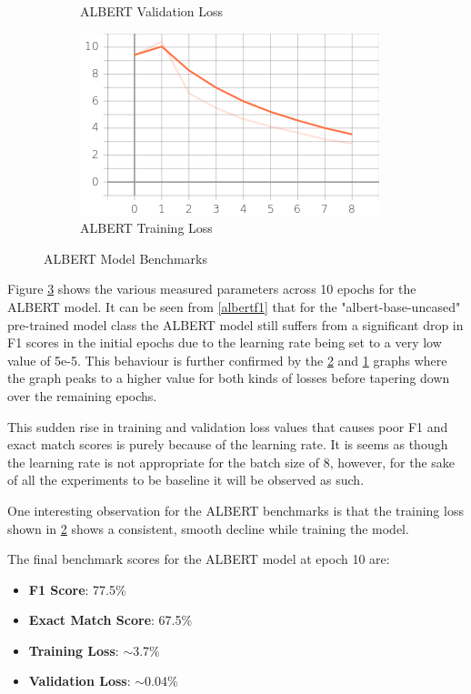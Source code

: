 \documentclass[a4paper,12pt]{report}
\begin{document}
\begin{figure}
\begin{subfigure}[b]{0.4\textwidth}
    			\caption{\small ALBERT Validation Loss}
    			\label{albertValLoss}
    		\end{subfigure}
    		\hfill
    		\begin{subfigure}[b]{0.4\textwidth}
    			\centering
    			\includegraphics[width=\textwidth]{../images/Albert_Train_Loss.png}
    			\caption{\small ALBERT Training Loss}
    			\label{albertTrainLoss}
    		\end{subfigure}
    		\caption{ALBERT Model Benchmarks}
    		\label{albertBenchmarks}
    	\end{figure}

    	Figure \ref{albertBenchmarks} shows the various measured parameters across 10 epochs for the ALBERT model. It can be seen from \ref{albertf1} that for the "albert-base-uncased" pre-trained model class the ALBERT model still suffers from a significant drop in F1 scores in the initial epochs due to the learning rate being set to a very low value of 5e-5. This behaviour is further confirmed by the \ref{albertTrainLoss} and \ref{albertValLoss} graphs where the graph peaks to a higher value for both kinds of losses before tapering down over the remaining epochs.

    	This sudden rise in training and validation loss values that causes poor F1 and exact match scores is purely because of the learning rate. It is seems as though the learning rate is  not appropriate for the batch size of 8, however, for the sake of all the experiments to be baseline it will be observed as such.

    	One interesting observation for the ALBERT benchmarks is that the training loss shown in \ref{albertTrainLoss} shows a consistent, smooth decline while training the model.


    	The final benchmark scores for the ALBERT model at epoch 10 are:
    	\begin{itemize}
    		\item \textbf{F1 Score}: 77.5\%
    		\item \textbf{Exact Match Score}: 67.5\%
    		\item \textbf{Training Loss}:  $\sim$3.7\%
    		\item \textbf{Validation Loss}: $\sim$0.04\%
    	\end{itemize}
\end{document}
